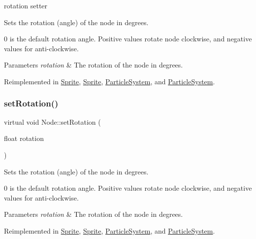 rotation setter 

Sets the rotation (angle) of the node in degrees.

0 is the default rotation angle. Positive values rotate node clockwise, and negative values for anti-\/clockwise.


\begin{DoxyParams}{Parameters}
{\em rotation} & The rotation of the node in degrees. \\
\hline
\end{DoxyParams}


Reimplemented in \hyperlink{classSprite_a456ab327b49e657c504cb41ce3f0bd77}{Sprite}, \hyperlink{classSprite_a943f5aa94fccc46930b978d291ff0cfe}{Sprite}, \hyperlink{classParticleSystem_a0616c2ca4a0618b811c692e30aa9213f}{Particle\+System}, and \hyperlink{classParticleSystem_ad3fffe8df2aafe8a5bbf9402b0dbe4a3}{Particle\+System}.

\mbox{\label{classNode_ad2e0cda8797b5b94398a123bfe600f21}} 
\subsubsection{\texorpdfstring{set\+Rotation()}{setRotation()}\hspace{0.1cm}{\footnotesize\ttfamily [2/2]}}
{\footnotesize\ttfamily virtual void Node\+::set\+Rotation (\begin{DoxyParamCaption}\item[{float}]{rotation }\end{DoxyParamCaption})\hspace{0.3cm}{\ttfamily [virtual]}}

Sets the rotation (angle) of the node in degrees.

0 is the default rotation angle. Positive values rotate node clockwise, and negative values for anti-\/clockwise.


\begin{DoxyParams}{Parameters}
{\em rotation} & The rotation of the node in degrees. \\
\hline
\end{DoxyParams}


Reimplemented in \hyperlink{classSprite_a456ab327b49e657c504cb41ce3f0bd77}{Sprite}, \hyperlink{classSprite_a943f5aa94fccc46930b978d291ff0cfe}{Sprite}, \hyperlink{classParticleSystem_a0616c2ca4a0618b811c692e30aa9213f}{Particle\+System}, and \hyperlink{classParticleSystem_ad3fffe8df2aafe8a5bbf9402b0dbe4a3}{Particle\+System}.

